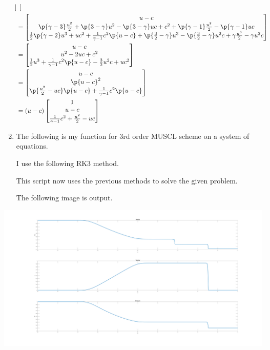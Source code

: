 \documentclass[11pt, oneside]{article}
\begin{document}
\begin{enumerate}
\begin{align*}
\begin{bmatrix}
      \end{bmatrix} \\
      &=
      \begin{bmatrix}
        u - c \\
        \p{\gamma - 3} \frac{u^2}{2} + \p{3 - \gamma}u^2 - \p{3 - \gamma}uc + c^2 + \p{\gamma - 1}\frac{u^2}{2} - \p{\gamma - 1}uc \\
        \frac{1}{2}\p{\gamma - 2} u^3 + uc^2 + \frac{1}{\gamma - 1}c^2\p{u-c} + \p{\frac{3}{2} - \gamma}u^3 - \p{\frac{3}{2} - \gamma}u^2c + \gamma\frac{u^3}{2} - \gamma u^2c
      \end{bmatrix} \\
      &=
      \begin{bmatrix}
        u - c \\
        u^2 - 2uc + c^2 \\
        \frac{1}{2} u^3 + \frac{1}{\gamma - 1}c^2\p{u-c} - \frac{3}{2}u^2c + uc^2
      \end{bmatrix} \\
      &=
      \begin{bmatrix}
        u - c \\
        \p{u - c}^2 \\
        \p{\frac{u^2}{2} - uc}\p{u - c} + \frac{1}{\gamma - 1}c^2\p{u - c}
      \end{bmatrix} \\
      &= (u - c)
      \begin{bmatrix}
        1 \\
        u - c \\
        \frac{1}{\gamma - 1}c^2 + \frac{u^2}{2} - uc
      \end{bmatrix} \\
    \end{align*}

  \item %
    The following is my function for 3rd order MUSCL scheme on a system of equations.
    
    I use the following RK3 method.
    
    This script now uses the previous methods to solve the given problem.
    

    The following image is output.
\end{enumerate}
\includegraphics[scale=0.22]{Figures/finalProject.png}
\end{document}
